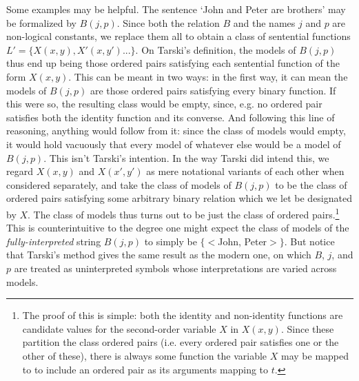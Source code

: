\documentclass[]{article}
\begin{document}
Some examples may be helpful. The sentence `John and Peter are brothers' may be formalized by $B(j, p)$. Since both the relation $B$ and the names $j$ and $p$ are non-logical constants, we replace them all to obtain a class of sentential functions $L' = \{X(x, y), X'(x, y')...\}$. On Tarski's definition, the models of $B(j, p)$ thus end up being those ordered pairs satisfying each sentential function of the form $X(x, y)$. This can be meant in two ways: in the first way, it can mean the models of $B(j, p)$ are those ordered pairs satisfying every binary function. If this were so, the resulting class would be empty, since, e.g. no ordered pair satisfies both the identity function and its converse. And following this line of reasoning, anything would follow from it: since the class of models would empty, it would hold vacuously that every model of whatever else would be a model of $B(j, p)$. This isn't Tarski's intention. In the way Tarski did intend this, we regard $X(x, y)$ and $X(x', y')$ as mere notational variants of each other when considered separately, and take the class of models of $B(j, p)$ to be the class of ordered pairs satisfying some arbitrary binary relation which we let be designated by $X$. The class of models thus turns out to be just the class of ordered pairs.\footnote{The proof of this is simple: both the identity and non-identity functions are candidate values for the second-order variable $X$ in $X(x, y)$. Since these partition the class ordered pairs (i.e. every ordered pair satisfies one or the other of these), there is always some function the variable $X$ may be mapped to to include an ordered pair as its arguments mapping to $t$.} This is counterintuitive to the degree one might expect the class of models of the \textit{fully-interpreted} string $B(j, p)$ to simply be $\{<$John, Peter$>\}$. But notice that Tarski's method gives the same result as the modern one, on which $B$, $j$, and $p$ are treated as uninterpreted symbols whose interpretations are varied across models.
\end{document}

